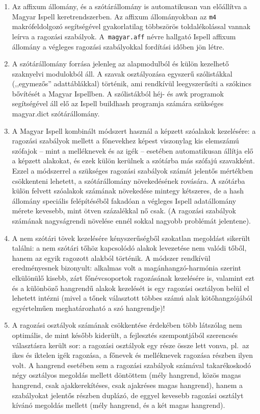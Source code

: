 \begin{enumerate}
\item Az affixum állomány, és a szótárállomány is automatikusan
van előállítva a Magyar Ispell keretrendszerben.
Az affixum állományokban az \texttt{m4} makrófeldolgozó segítségével
gyakorlatilag többszörös toldalékolással vannak leírva
a ragozási szabályok. A~\texttt{magyar.aff} névre hallgató
Ispell affixum állomány a végleges
ragozási szabályokkal fordítási időben jön létre.

\item A szótárállomány forrása jelenleg az alapmodulból és külön kezelhető
szaknyelvi modulokból áll.  A szavak osztályozása egyszerű
szólistákkal (,,egymezős'' adattáblákkal) történik, ami rendkívül
leegyszerűsíti a szókincs bővítését a Magyar Ispellben. A
szólistákból héj- és awk programok segítségével áll elő az Ispell
buildhash programja számára szükséges magyar.dict szótárállomány.

\item A Magyar Ispell kombinált módszert használ a képzett
szóalakok kezelésére: a ragozási szabályok mellett
a főnevekhez képest viszonylag kis elemszámú szófajok -- mint a
melléknevek és az igék -- esetében automatikusan állítja elő
a képzett alakokat, és ezek külön kerülnek a szótárba
más szófajú szavakként. Ezzel a módszerrel a szükséges
ragozási szabályok számát jelentős mértékben csökkenteni
lehetett, a szótárállomány növekedésének rovására.
A szótárba külön felvett szóalakok számának
növekedése mintegy kétszeres, de a hash állomány speciális
felépítéséből fakadóan a végleges Ispell adatállomány
mérete kevesebb, mint ötven százalékkal nő csak. 
(A ragozási szabályok számának nagyságrendi növelése ennél
sokkal nagyobb problémát jelentene).

\item A nem szótári tövek kezelésére kényszerűségből
szokatlan megoldást sikerült találni: a nem szótári tőhöz kapcsolódó
alakok levezetése nem valódi tőből, hanem az egyik ragozott alakból
történik. A módszer rendkívül eredményesnek
bizonyult: alkalmas volt a magánhangzó-harmónia
szerint elkülönülő kisebb, zárt főnévcsoportok ragozásának
kezelésére is, valamint ezt és a különböző hangrendű alakok kezelését
is egy ragozási osztályon belül el lehetett intézni (mivel a tőnek
választott többes számú alak kötőhangzójából egyértelműen
meghatározható a szó hangrendje)!

\item A ragozási osztályok számának csökkentése érdekében
több látszólag nem optimális, de mint később
kiderült, a fejlesztés szempontjából szerencsés választásra
került sor: a ragozási osztályok egy része
össze lett vonva, pl.\ az ikes és iktelen igék ragozása,
a főnevek és melléknevek ragozása részben ilyen volt.
A hangrend esetében sem a ragozási szabályok számával takarékoskodó
négy osztályos megoldás mellett döntöttem (mély hangrend,
közös magas hangrend, csak ajakkerekítéses, csak ajakréses magas
hangrend), hanem a szabályokat jelentős részben duplázó,
de eggyel kevesebb ragozási osztályt kívánó megoldás mellett
(mély hangrend, és a két magas hangrend).


\end{enumerate}
